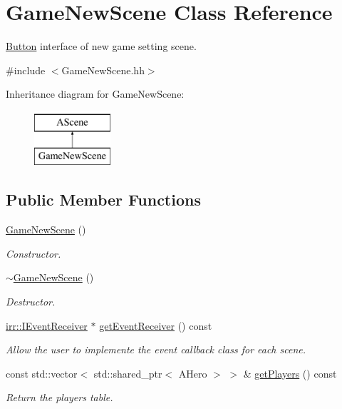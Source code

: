 \hypertarget{classGameNewScene}{}\section{Game\+New\+Scene Class Reference}
\label{classGameNewScene}


\hyperlink{classButton}{Button} interface of new game setting scene.  




{\ttfamily \#include $<$Game\+New\+Scene.\+hh$>$}

Inheritance diagram for Game\+New\+Scene\+:\begin{figure}[H]
\begin{center}
\leavevmode
\includegraphics[height=2.000000cm]{classGameNewScene}
\end{center}
\end{figure}
\subsection*{Public Member Functions}
\begin{DoxyCompactItemize}
\item 
\hyperlink{classGameNewScene_af482b13a2d9e315ef39a6e41293bf4fb}{Game\+New\+Scene} ()
\begin{DoxyCompactList}\small\item\em Constructor. \end{DoxyCompactList}\item 
\hyperlink{classGameNewScene_a3df0ff81012d3f7dbd08c7367be22fdf}{$\sim$\+Game\+New\+Scene} ()
\begin{DoxyCompactList}\small\item\em Destructor. \end{DoxyCompactList}\item 
\hyperlink{classirr_1_1IEventReceiver}{irr\+::\+I\+Event\+Receiver} $\ast$ \hyperlink{classGameNewScene_a21c27ef3ea1923d975683e1bcdd134fa}{get\+Event\+Receiver} () const
\begin{DoxyCompactList}\small\item\em Allow the user to implemente the event callback class for each scene. \end{DoxyCompactList}\item 
\mbox{\label{classGameNewScene_a6aa753c0f281a3e1f0ed06fe10e070f4}} 
const std\+::vector$<$ std\+::shared\+\_\+ptr$<$ A\+Hero $>$ $>$ \& \hyperlink{classGameNewScene_a6aa753c0f281a3e1f0ed06fe10e070f4}{get\+Players} () const
\begin{DoxyCompactList}\small\item\em Return the players table. \end{DoxyCompactList}\end{DoxyCompactItemize}



